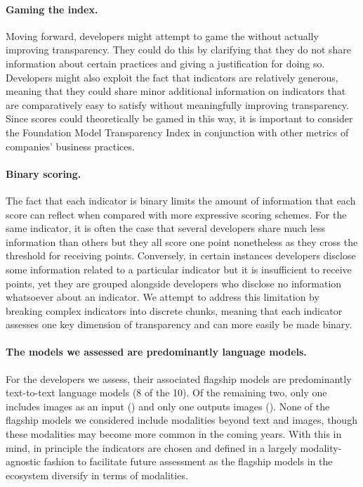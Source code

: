 \documentclass[screen, authorversion, acmsmall]{acmart}
\begin{document}
\paragraph{Gaming the index.}
Moving forward, developers might attempt to game the \projectname without actually improving transparency. 
They could do this by clarifying that they do not share information about certain practices and giving a justification for doing so. 
Developers might also exploit the fact that indicators are relatively generous, meaning that they could share minor additional information on indicators that are comparatively easy to satisfy without meaningfully improving transparency.
Since scores could theoretically be gamed in this way, it is important to consider the Foundation Model Transparency Index in conjunction with other metrics of companies' business practices. 

\paragraph{Binary scoring.} 
The fact that each indicator is binary limits the amount of information that each score can reflect when compared with more expressive scoring schemes.
For the same indicator, it is often the case that several developers share much less information than others but they all score one point nonetheless as they cross the threshold for receiving points.
Conversely, in certain instances developers disclose some information related to a particular indicator but it is insufficient to receive points, yet they are grouped alongside developers who disclose no information whatsoever about an indicator. 
We attempt to address this limitation by breaking complex indicators into discrete chunks, meaning that each indicator assesses one key dimension of transparency and can more easily be made binary.

\paragraph{The models we assessed are predominantly language models.} 
For the developers we assess, their associated flagship models are predominantly text-to-text language models (8 of the 10).
Of the remaining two, only one includes images as an input (\gptfour) and only one outputs images (\stablediffusion).
None of the flagship models we considered include modalities beyond text and images, though these modalities may become more common in the coming years. 
With this in mind, in principle the indicators are chosen and defined in a largely modality-agnostic fashion to facilitate future assessment as the flagship models in the ecosystem diversify in terms of modalities.
\end{document}
